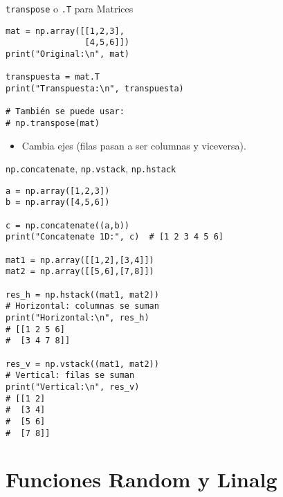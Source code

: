 \documentclass[10pt]{beamer}
\begin{document}
\begin{frame}[fragile]{\texttt{transpose} o \texttt{.T} para Matrices}
\begin{verbatim}
mat = np.array([[1,2,3],
                [4,5,6]])
print("Original:\n", mat)

transpuesta = mat.T
print("Transpuesta:\n", transpuesta)

# También se puede usar:
# np.transpose(mat)
\end{verbatim}
\begin{itemize}
  \item Cambia ejes (filas pasan a ser columnas y viceversa).
\end{itemize}
\end{frame}

\begin{frame}[fragile]{\texttt{np.concatenate}, \texttt{np.vstack}, \texttt{np.hstack}}
\begin{verbatim}
a = np.array([1,2,3])
b = np.array([4,5,6])

c = np.concatenate((a,b))
print("Concatenate 1D:", c)  # [1 2 3 4 5 6]

mat1 = np.array([[1,2],[3,4]])
mat2 = np.array([[5,6],[7,8]])

res_h = np.hstack((mat1, mat2))
# Horizontal: columnas se suman
print("Horizontal:\n", res_h)
# [[1 2 5 6]
#  [3 4 7 8]]

res_v = np.vstack((mat1, mat2))
# Vertical: filas se suman
print("Vertical:\n", res_v)
# [[1 2]
#  [3 4]
#  [5 6]
#  [7 8]]
\end{verbatim}
\end{frame}

\section{Funciones Random y Linalg}
\end{document}
